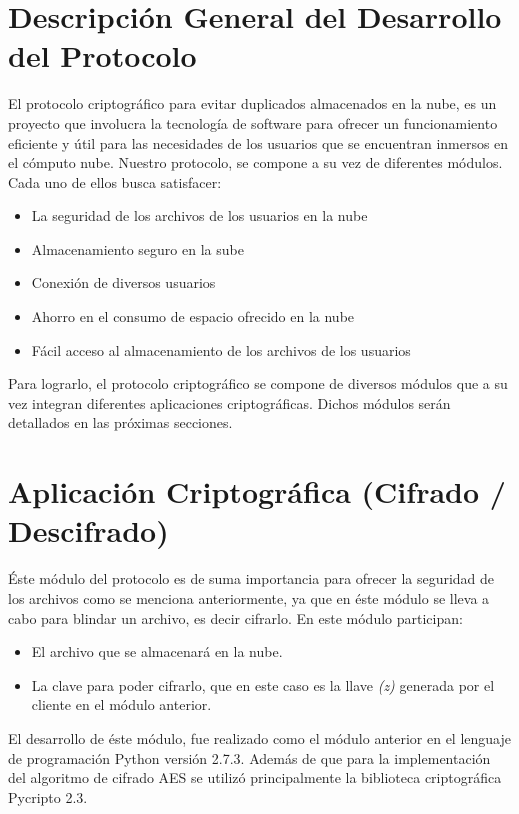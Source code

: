 


\section{Descripción General del Desarrollo del Protocolo}
El protocolo criptográfico para evitar duplicados almacenados en la nube, es un proyecto que involucra la tecnología de software para ofrecer un funcionamiento eficiente y útil para las necesidades de los usuarios que se encuentran inmersos en el cómputo nube. 
Nuestro protocolo, se compone a su vez de diferentes módulos. Cada uno de ellos busca satisfacer: \\ 

\begin{itemize}

\item La seguridad de los archivos de los usuarios en la nube
\item Almacenamiento seguro en la sube
\item Conexión de diversos usuarios 
\item Ahorro en el consumo de espacio ofrecido en la nube 
\item Fácil acceso al almacenamiento de los archivos de los usuarios 

\end{itemize} 

Para lograrlo, el protocolo criptográfico se compone de diversos módulos que a su vez integran diferentes aplicaciones criptográficas. Dichos módulos serán detallados en las próximas secciones. 

\section{Aplicación Criptográfica (Cifrado / Descifrado)}

Éste módulo del protocolo es de suma importancia para ofrecer la seguridad de los archivos como se menciona anteriormente, ya que en éste módulo se lleva a cabo para blindar un archivo, es decir cifrarlo.  En este módulo participan: 

	\begin{itemize}
	\item El archivo que se almacenará en la nube.
	\item La clave para poder cifrarlo, que en este caso es la llave \textit{(z)} generada por el cliente en el módulo anterior. 
	\end{itemize}
El desarrollo de éste módulo, fue realizado como el módulo anterior en el lenguaje de programación Python versión 2.7.3. Además de que para la implementación del algoritmo de cifrado AES se utilizó principalmente la biblioteca criptográfica Pycripto 2.3. 

